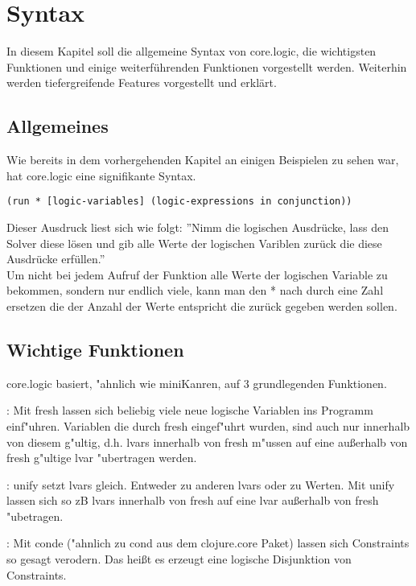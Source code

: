 \section{Syntax}

In diesem Kapitel soll die allgemeine Syntax von core.logic, die wichtigsten Funktionen und einige weiterführenden Funktionen vorgestellt werden. Weiterhin werden tiefergreifende Features vorgestellt und erklärt.

\subsection{Allgemeines}

Wie bereits in dem vorhergehenden Kapitel an einigen Beispielen zu sehen war, hat core.logic eine signifikante Syntax.
\begin{lstlisting}
(run * [logic-variables] (logic-expressions in conjunction))
\end{lstlisting}
Dieser Ausdruck liest sich wie folgt: ''Nimm die logischen Ausdrücke, lass den Solver diese lösen und gib alle Werte der logischen Variblen zurück die diese Ausdrücke erfüllen.''\\

Um nicht bei jedem Aufruf der  Funktion alle Werte der logischen Variable zu bekommen, sondern nur endlich viele, kann man den * nach  durch eine Zahl ersetzen die der Anzahl der Werte entspricht die zurück gegeben werden sollen.


\subsection{Wichtige Funktionen}

core.logic basiert, "ahnlich wie miniKanren, auf 3 grundlegenden Funktionen.
\begin{description}
\item{:}
Mit fresh lassen sich beliebig viele neue logische Variablen ins Programm einf"uhren. Variablen die durch fresh eingef"uhrt wurden, sind auch nur innerhalb von diesem g"ultig, d.h. lvars innerhalb von fresh m"ussen auf eine au\ss{}erhalb von fresh g"ultige lvar "ubertragen werden.

\item{:}
unify setzt lvars gleich. Entweder zu anderen lvars oder zu Werten. Mit unify lassen sich so zB lvars innerhalb von fresh auf eine lvar au\ss{}erhalb von fresh "ubetragen.

\item{:}
Mit conde ("ahnlich zu cond aus dem clojure.core Paket) lassen sich Constraints so gesagt \dq{}verodern\dq{}. Das heißt es erzeugt eine logische Disjunktion von Constraints.
\end{description}

